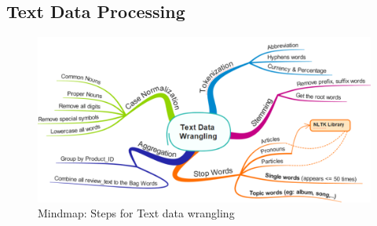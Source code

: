 \documentclass[a4paper,11pt]{article}
\begin{document}
	\subsection{Text Data Processing}
		\begin{figure}[H]
			\includegraphics[width=1.2\textwidth, center]{pic4}
			\caption{Mindmap: Steps for Text data wrangling}
		\end{figure}
		
\end{document}

